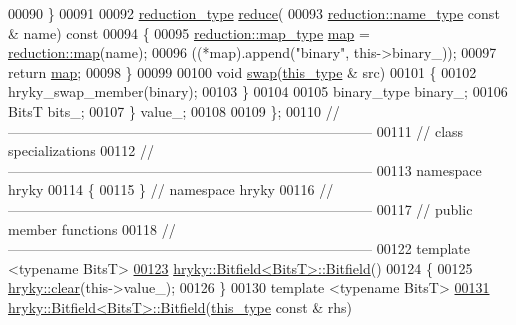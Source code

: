 \begin{DoxyCode}
00090         \}
00091 
00092         \hyperlink{namespacehryky_a343a9a4c36a586be5c2693156200eadc}{reduction_type} \hyperlink{classhryky_1_1_bitfield_a5cebc48b87ae30dfa43cbcbda5cc9de8}{reduce}(
00093             \hyperlink{namespacehryky_1_1reduction_ac686c30a4c8d196bbd0f05629a6b921f}{reduction::name_type} \textcolor{keyword}{const} & name)\textcolor{keyword}{ const}
00094 \textcolor{keyword}{        }\{
00095             \hyperlink{namespacehryky_1_1reduction_a64228de3f2cff9ed9d5ad836a120c7f7}{reduction::map_type} \hyperlink{namespacehryky_1_1reduction_ac5eae270cf8047b294dc4ff3e5e11a79}{map} = \hyperlink{namespacehryky_1_1reduction_ac5eae270cf8047b294dc4ff3e5e11a79}{reduction::map}(name);
00096             ((*map).append(\textcolor{stringliteral}{"binary"}, this->binary\_));
00097             \textcolor{keywordflow}{return} \hyperlink{namespacehryky_1_1reduction_ac5eae270cf8047b294dc4ff3e5e11a79}{map};
00098         \}
00099 
00100         \textcolor{keywordtype}{void} \hyperlink{classhryky_1_1_bitfield_a8425c4e2e86ec47dca85a13fdcee5ee0}{swap}(\hyperlink{classhryky_1_1_bitfield_a92159139a91a26878ed5293d99024434}{this_type} & src)
00101         \{
00102             hryky\_swap\_member(binary);
00103         \}
00104         
00105         binary\_type binary\_;
00106         BitsT bits\_;
00107     \} value\_;
00108 
00109 \};
00110 \textcolor{comment}{//
      ------------------------------------------------------------------------------}
00111 \textcolor{comment}{// class specializations}
00112 \textcolor{comment}{//
      ------------------------------------------------------------------------------}
00113 \textcolor{keyword}{namespace }hryky
00114 \{
00115 \} \textcolor{comment}{// namespace hryky}
00116 \textcolor{comment}{//
      ------------------------------------------------------------------------------}
00117 \textcolor{comment}{// public member functions}
00118 \textcolor{comment}{//
      ------------------------------------------------------------------------------}
00122 \textcolor{comment}{}\textcolor{keyword}{template} <\textcolor{keyword}{typename} BitsT>
\hypertarget{bitfield_8h_source_l00123}{}\hyperlink{classhryky_1_1_bitfield_abfb50271df7f7488c79371587846da92}{00123} \hyperlink{classhryky_1_1_bitfield_abfb50271df7f7488c79371587846da92}{hryky::Bitfield<BitsT>::Bitfield}()
00124 \{
00125     \hyperlink{namespacehryky_aa201297ea9530da954a7230be71cc19d}{hryky::clear}(this->value\_);
00126 \}
00130 \textcolor{keyword}{template} <\textcolor{keyword}{typename} BitsT>
\hypertarget{bitfield_8h_source_l00131}{}\hyperlink{classhryky_1_1_bitfield_a3a77f4b3ee8805ee6f7b23e2fa800313}{00131} \hyperlink{classhryky_1_1_bitfield_abfb50271df7f7488c79371587846da92}{hryky::Bitfield<BitsT>::Bitfield}(\hyperlink{classhryky_1_1_bitfield}{this_type} \textcolor{keyword}{const} & rhs)

\end{DoxyCode}

